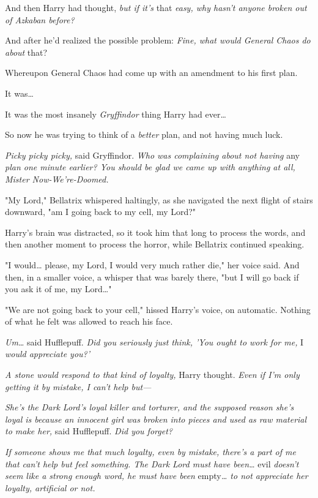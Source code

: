 And then Harry had thought, \emph{but if it's} that\emph{ easy, why hasn't 
anyone broken out of Azkaban before?}

And after he'd realized the possible problem: \emph{Fine, what would General 
Chaos do about} that?

Whereupon General Chaos had come up with an amendment to his first plan.

It was{\ldots}

It was the most insanely \emph{Gryffindor} thing Harry had ever{\ldots}

So now he was trying to think of a \emph{better} plan, and not having much luck.

\emph{Picky picky picky,} said Gryffindor. \emph{Who was complaining about not 
having} any\emph{ plan one minute earlier? You should be glad we came up with 
anything at all, Mister Now-We're-Doomed.}

"My Lord," Bellatrix whispered haltingly, as she navigated the next flight of 
stairs downward, "am I going back to my cell, my Lord?"

Harry's brain was distracted, so it took him that long to process the words, 
and then another moment to process the horror, while Bellatrix continued 
speaking.

"I would{\ldots} please, my Lord, I would very much rather die," her voice 
said. And then, in a smaller voice, a whisper that was barely there, "but I 
will go back if you ask it of me, my Lord{\ldots}"

"We are not going back to your cell," hissed Harry's voice, on automatic. 
Nothing of what he felt was allowed to reach his face.

\emph{Um{\ldots}} said Hufflepuff. \emph{Did you seriously just think, 'You 
ought to work for me,} I\emph{ would appreciate you?'}

\emph{A stone would respond to that kind of loyalty,} Harry thought. \emph{Even 
if I'm only getting it by mistake, I can't help but---}

\emph{She's the Dark Lord's loyal killer and torturer, and the supposed reason 
she's loyal is because an innocent girl was broken into pieces and used as raw 
material to make her,} said Hufflepuff. \emph{Did you forget?}

\emph{If someone shows me that much loyalty, even by mistake, there's a part of 
me that can't help but feel something. The Dark Lord must have been{\ldots}} 
evil\emph{ doesn't seem like a strong enough word, he must have been} 
empty\emph{{\ldots} to not appreciate her loyalty, artificial or not.}

